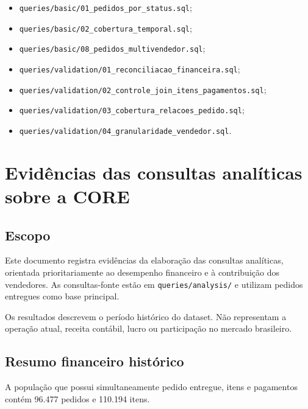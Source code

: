 \documentclass[12pt,a4paper]{article}
\providecommand{\tightlist}{
  \setlength{\itemsep}{0pt}\setlength{\parskip}{0pt}
}
\begin{document}
\begin{itemize}
\tightlist
\item
  \nolinkurl{queries/basic/01_pedidos_por_status.sql};
\item
  \nolinkurl{queries/basic/02_cobertura_temporal.sql};
\item
  \nolinkurl{queries/basic/08_pedidos_multivendedor.sql};
\item
  \nolinkurl{queries/validation/01_reconciliacao_financeira.sql};
\item
  \nolinkurl{queries/validation/02_controle_join_itens_pagamentos.sql};
\item
  \nolinkurl{queries/validation/03_cobertura_relacoes_pedido.sql};
\item
  \nolinkurl{queries/validation/04_granularidade_vendedor.sql}.
\end{itemize}

\section{Evidências das consultas analíticas sobre a
CORE}\label{docs__analytics__evidencias_consultas_analiticas_core.md__eviduxeancias-das-consultas-analuxedticas-sobre-a-core}

\subsection{Escopo}\label{docs__analytics__evidencias_consultas_analiticas_core.md__escopo}

Este documento registra evidências da elaboração das consultas analíticas, orientada
prioritariamente ao desempenho financeiro e à contribuição dos
vendedores. As consultas-fonte estão em \nolinkurl{queries/analysis/} e
utilizam pedidos entregues como base principal.

Os resultados descrevem o período histórico do dataset. Não representam
a operação atual, receita contábil, lucro ou participação no mercado
brasileiro.

\subsection{Resumo financeiro
histórico}\label{docs__analytics__evidencias_consultas_analiticas_core.md__resumo-financeiro-histuxf3rico}

A população que possui simultaneamente pedido entregue, itens e
pagamentos contém 96.477 pedidos e 110.194 itens.
\end{document}
